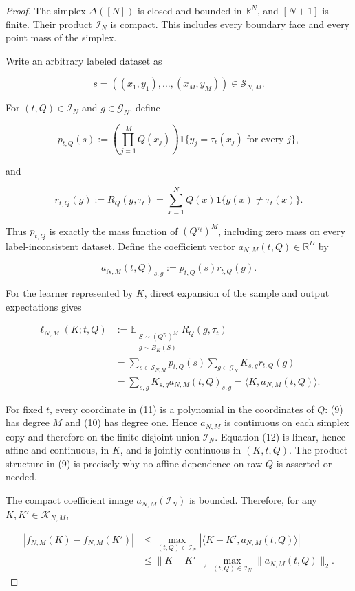 \begin{proof}
The simplex \(\Delta([N])\) is closed and bounded in \(\mathbb R^N\), and
\([N+1]\) is finite. Their product \(\mathcal I_N\) is compact. This includes
every boundary face and every point mass of the simplex.

Write an arbitrary labeled dataset as

\[
s=((x_1,y_1),\ldots,(x_M,y_M))\in\mathcal S_{N,M}.
\]

For \((t,Q)\in\mathcal I_N\) and \(g\in\mathcal G_N\), define

\[
p_{t,Q}(s)
:=\left(\prod_{j=1}^M Q(x_j)\right)
  \mathbf 1\{y_j=\tau_t(x_j)\text{ for every }j\},
\tag{9}
\]

and

\[
r_{t,Q}(g)
:=R_Q(g,\tau_t)
=\sum_{x=1}^N Q(x)\mathbf 1\{g(x)\ne\tau_t(x)\}.
\tag{10}
\]

Thus \(p_{t,Q}\) is exactly the mass function of
\((Q^{\tau_t})^M\), including zero mass on every label-inconsistent
dataset. Define the coefficient vector \(a_{N,M}(t,Q)\in\mathbb R^D\) by

\[
a_{N,M}(t,Q)_{s,g}:=p_{t,Q}(s)r_{t,Q}(g).
\tag{11}
\]

For the learner represented by \(K\), direct expansion of the sample and
output expectations gives

\[
\begin{aligned}
\ell_{N,M}(K;t,Q)
&:=\mathbb E_{\substack{S\sim(Q^{\tau_t})^M\\g\sim B_K(S)}}
       R_Q(g,\tau_t)\\
&=\sum_{s\in\mathcal S_{N,M}}p_{t,Q}(s)
  \sum_{g\in\mathcal G_N}K_{s,g}r_{t,Q}(g)\\
&=\sum_{s,g}K_{s,g}a_{N,M}(t,Q)_{s,g}
=\langle K,a_{N,M}(t,Q)\rangle.
\end{aligned}
\tag{12}
\]

For fixed \(t\), every coordinate in (11) is a polynomial in the coordinates
of \(Q\): (9) has degree \(M\) and (10) has degree one. Hence
\(a_{N,M}\) is continuous on each simplex copy and therefore on the finite
disjoint union \(\mathcal I_N\). Equation (12) is linear, hence affine and
continuous, in \(K\), and is jointly continuous in \((K,t,Q)\). The product
structure in (9) is precisely why no affine dependence on raw \(Q\) is
asserted or needed.

The compact coefficient image
\(a_{N,M}(\mathcal I_N)\) is bounded. Therefore, for any
\(K,K'\in\mathcal K_{N,M}\),

\[
\begin{aligned}
|f_{N,M}(K)-f_{N,M}(K')|
&\le
\max_{(t,Q)\in\mathcal I_N}
  |\langle K-K',a_{N,M}(t,Q)\rangle|\\
&\le \|K-K'\|_2
\max_{(t,Q)\in\mathcal I_N}\|a_{N,M}(t,Q)\|_2.
\end{aligned}
\tag{13}
\]


\end{proof}
